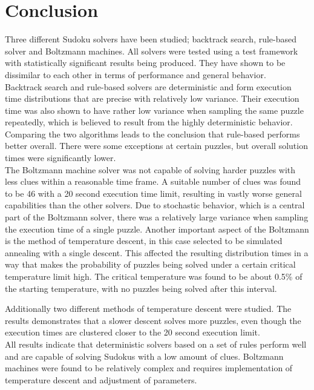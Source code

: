 \documentclass[a4paper,11pt]{kth-mag}
\begin{document}
\chapter{Conclusion}
Three different Sudoku solvers have been studied; backtrack search, rule-based solver and Boltzmann machines.
All solvers were tested using a test framework with statistically significant results being produced.
They have shown to be dissimilar to each other in terms of performance and general behavior.\\

Backtrack search and rule-based solvers are deterministic and form execution time distributions that are precise with relatively low variance.
Their execution time was also shown to have rather low variance when sampling the same puzzle repeatedly, which is believed to result from the highly deterministic behavior.
Comparing the two algorithms leads to the conclusion that rule-based performs better overall.
There were some exceptions at certain puzzles, but overall solution times were significantly lower.\\

The Boltzmann machine solver was not capable of solving harder puzzles with less clues within a reasonable time frame.
A suitable number of clues was found to be 46 with a 20 second execution time limit, resulting in vastly worse general capabilities than the other solvers.
Due to stochastic behavior, which is a central part of the Boltzmann solver, there was a relatively large variance when sampling the execution time of a single puzzle.
Another important aspect of the Boltzmann is the method of temperature descent, in this case selected to be simulated annealing with a single descent.
This affected the resulting distribution times in a way that makes the probability of puzzles being solved under a certain critical temperature limit high.
The critical temperature was found to be about 0.5\% of the starting temperature, with no puzzles being solved after this interval.

Additionally two different methods of temperature descent were studied.
The results demonstrates that a slower descent solves more puzzles, even though the execution times are clustered closer to the 20 second execution limit.\\

All results indicate that deterministic solvers based on a set of rules perform well and are capable of solving Sudokus with a low amount of clues.
Boltzmann machines were found to be relatively complex and requires implementation of temperature descent and adjustment of parameters.\\
\end{document}
